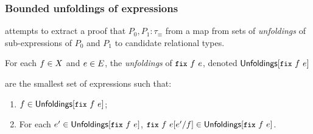 \subsubsection{Bounded unfoldings of expressions}
\label{sec:bnd-unfoldings}


\sys attempts to extract a proof that $P_0, P_1 : \tau_{\equiv}$ from
a map from sets of \emph{unfoldings} of sub-expressions of $P_0$
and $P_1$ to candidate relational types.
%
\begin{defn}
  \label{defn:unfoldings}
  For each $f \in X$ and $e \in E$, the \emph{unfoldings} of
  $\fix{f}{e}$, denoted $\unfoldings{ \fix{f}{e} }$

 are the smallest set of expressions such that:
  \begin{enumerate}
  \item $f \in \unfoldings{ \fix{f}{e} }$;
  \item For each $e' \in \unfoldings{ \fix{f}{e} }$, $\replace{
      \fix{f}{e} }{ f }{ e' } \in \unfoldings{ \fix{f}{e} }$.
  \end{enumerate}
\end{defn}
%
%

